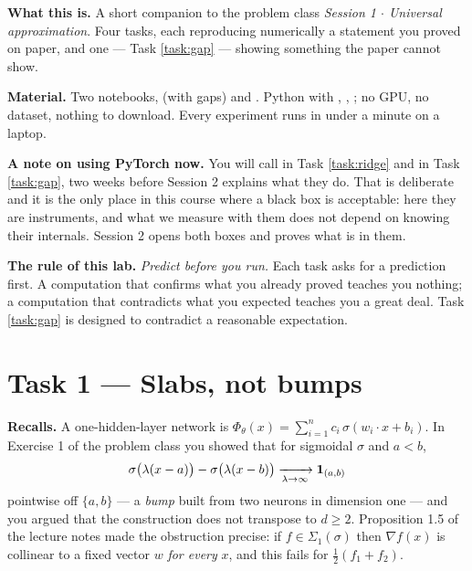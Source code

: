 \documentclass[11pt,a4paper]{article}
\begin{document}

\vspace{6pt}

\begin{plainbox}
\textbf{What this is.} A short companion to the problem class \emph{Session 1 $\cdot$ Universal
approximation}. Four tasks, each reproducing numerically a statement you proved on paper, and one
--- Task \ref{task:gap} --- showing something the paper cannot show.

\smallskip
\textbf{Material.} Two notebooks,  (with gaps) and
. Python with , , ; no GPU, no
dataset, nothing to download. Every experiment runs in under a minute on a laptop.

\smallskip
\textbf{A note on using PyTorch now.} You will call  in Task
\ref{task:ridge} and  in Task \ref{task:gap}, two weeks before Session 2
explains what they do. That is deliberate and it is the only place in this course where a black box
is acceptable: here they are instruments, and what we measure with them does not depend on knowing
their internals. Session 2 opens both boxes and proves what is in them.
\end{plainbox}

\vspace{4pt}

\begin{warnbox}
\textbf{The rule of this lab.} \emph{Predict before you run.} Each task asks for a prediction first.
A computation that confirms what you already proved teaches you nothing; a computation that
contradicts what you expected teaches you a great deal. Task \ref{task:gap} is designed to
contradict a reasonable expectation.
\end{warnbox}

\section{Task 1 --- Slabs, not bumps}

\begin{plainbox}
\textbf{Recalls.} A one-hidden-layer network is
$\Phi_\theta(x) = \sum_{i=1}^n c_i\,\sigma(w_i\cdot x + b_i)$. In Exercise 1 of the problem class you
showed that for sigmoidal $\sigma$ and $a<b$,
\[
\sigma\big(\lambda(x-a)\big) - \sigma\big(\lambda(x-b)\big) \xrightarrow[\lambda\to\infty]{} \mathbf{1}_{(a,b)}
\]
pointwise off $\{a,b\}$ --- a \emph{bump} built from two neurons in dimension one --- and you argued
that the construction does not transpose to $d\ge2$. Proposition 1.5 of the lecture notes made the
obstruction precise: if $f \in \Sigma_1(\sigma)$ then $\nabla f(x)$ is collinear to a fixed vector
$w$ \emph{for every} $x$, and this fails for $\tfrac12(f_1+f_2)$.
\end{plainbox}
\end{document}
